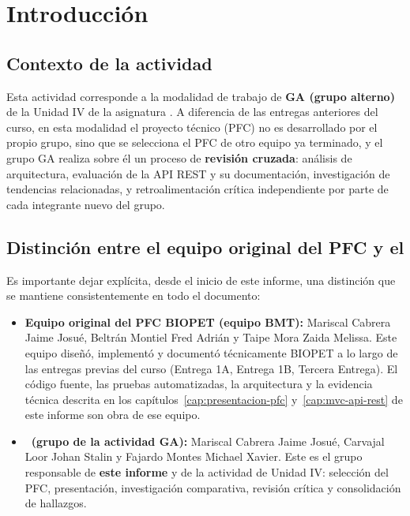\chapter{Introducci\'on}
\label{cap:introduccion}

\section{Contexto de la actividad}
\label{sec:contexto-actividad}

Esta actividad corresponde a la modalidad de trabajo de \textbf{GA (grupo
alterno)} de la Unidad IV de la asignatura \asignatura. A diferencia de las
entregas anteriores del curso, en esta modalidad el proyecto t\'ecnico
(PFC) no es desarrollado por el propio grupo, sino que se selecciona el PFC
de otro equipo ya terminado, y el grupo GA realiza sobre \'el un proceso de
\textbf{revisi\'on cruzada}: an\'alisis de arquitectura, evaluaci\'on de la
API REST y su documentaci\'on, investigaci\'on de tendencias relacionadas, y
retroalimentaci\'on cr\'itica independiente por parte de cada integrante
nuevo del grupo.

\section{Distinci\'on entre el equipo original del PFC y el \equipoga}
\label{sec:distincion-equipos}

Es importante dejar expl\'icita, desde el inicio de este informe, una
distinci\'on que se mantiene consistentemente en todo el documento:

\begin{itemize}[nosep]
  \item \textbf{Equipo original del PFC BIOPET (equipo BMT):} Mariscal
    Cabrera Jaime Josu\'e, Beltr\'an Montiel Fred Adri\'an y Taipe Mora
    Zaida Melissa. Este equipo dise\~n\'o, implement\'o y document\'o
    t\'ecnicamente BIOPET a lo largo de las entregas previas del curso
    (Entrega 1A, Entrega 1B, Tercera Entrega). El c\'odigo fuente, las
    pruebas automatizadas, la arquitectura y la evidencia t\'ecnica
    descrita en los cap\'itulos~\ref{cap:presentacion-pfc}
    y~\ref{cap:mvc-api-rest} de este informe son obra de ese equipo.
  \item \textbf{\equipoga\ (grupo de la actividad GA):} Mariscal Cabrera
    Jaime Josu\'e, Carvajal Loor Johan Stalin y Fajardo Montes Michael
    Xavier. Este es el grupo responsable de \textbf{este informe} y de la
    actividad de Unidad IV: selecci\'on del PFC, presentaci\'on,
    investigaci\'on comparativa, revisi\'on cr\'itica y consolidaci\'on de
    hallazgos.
\end{itemize}

